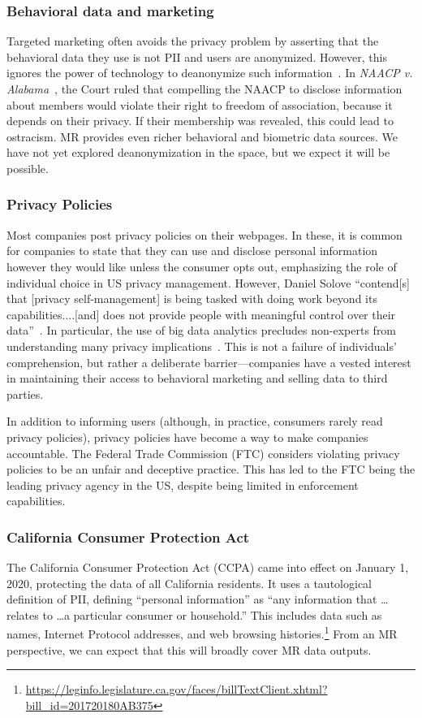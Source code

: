 \subsubsection{Behavioral data and marketing}

Targeted marketing often avoids the privacy problem by asserting that the behavioral data they use is not PII and users are anonymized. However, this ignores the power of technology to deanonymize such information~\cite{narayanan2008robust}. In \emph{NAACP v. Alabama}~\cite{1958naacp}, the Court ruled that compelling the NAACP to disclose information about members would violate their right to freedom of association, because it depends on their privacy. If their membership was revealed, this could lead to ostracism. MR provides even richer behavioral and biometric data sources. We have not yet explored deanonymization in the space, but we expect it will be possible.

\subsubsection{Privacy Policies}

Most companies post privacy policies on their webpages. In these, it is common for companies to state that they can use and disclose personal information however they would like unless the consumer opts out, emphasizing the role of individual choice in US privacy management. However, Daniel Solove ``contend[s] that [privacy self-management] is being tasked with doing work beyond its capabilities....[and] does not provide people with meaningful control over their data''~\cite{solove2012introduction}. In particular, the use of big data analytics precludes non-experts from understanding many privacy implications~\cite{baruh2017big}. This is not a failure of individuals' comprehension, but rather a deliberate barrier---companies have a vested interest in maintaining their access to behavioral marketing and selling data to third parties.

In addition to informing users (although, in practice, consumers rarely read privacy policies), privacy policies have become a way to make companies accountable. The Federal Trade Commission (FTC) considers violating privacy policies to be an unfair and deceptive practice. This has led to the FTC being the leading privacy agency in the US, despite being limited in enforcement capabilities.

\subsubsection{California Consumer Protection Act}
The California Consumer Protection Act (CCPA) came into effect on January 1, 2020, protecting the data of all California residents. It uses a tautological definition of PII, defining ``personal information'' as ``any information that \ldots relates to \ldots a particular consumer or household.'' This includes data such as names, Internet Protocol addresses, and web browsing histories.\footnote{\url{https://leginfo.legislature.ca.gov/faces/billTextClient.xhtml?bill_id=201720180AB375}}
 From an MR perspective, we can expect that this will broadly cover MR data outputs.

